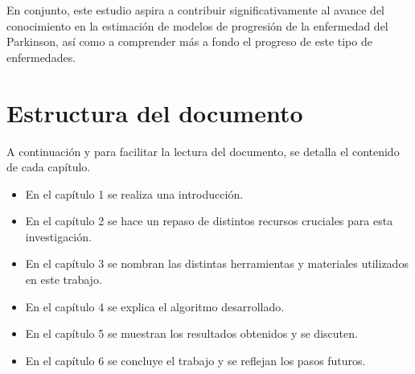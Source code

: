 En conjunto, este estudio aspira a contribuir significativamente al avance del conocimiento en la estimación de modelos de progresión de la enfermedad del Parkinson, así como a comprender más a fondo el progreso de este tipo de enfermedades.


\section{Estructura del documento}

A continuación y para facilitar la lectura del documento, se detalla el contenido de cada capítulo.

\begin{itemize}
\item En el capítulo 1 se realiza una introducción.
\item En el capítulo 2 se hace un repaso de distintos recursos cruciales para esta investigación.
\item En el capítulo 3 se nombran las distintas herramientas y materiales utilizados en este trabajo.
\item En el capítulo 4 se explica el algoritmo desarrollado. 
\item En el capítulo 5 se muestran los resultados obtenidos y se discuten.
\item En el capítulo 6 se concluye el trabajo y se reflejan los pasos futuros.
\end{itemize}
